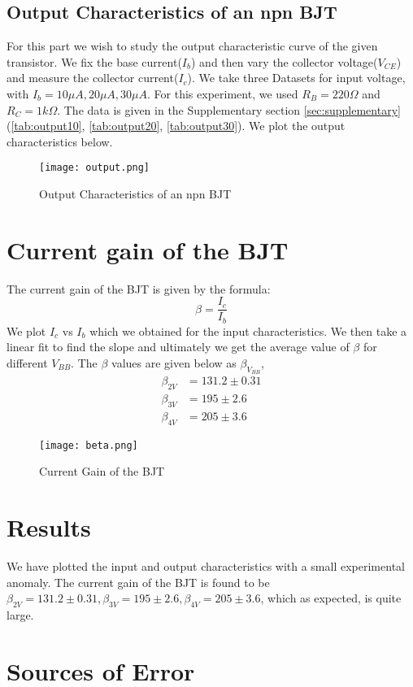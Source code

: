 \documentclass{scrartcl}
\newcommand{\1}{\mathbbm{1}}
\begin{document}
\subsection{Output Characteristics of an npn BJT}
For this part we wish to study the output characteristic curve of the given transistor. We fix the base current($I_b$) and then vary the collector voltage($V_{CE}$) and measure the collector current($I_c$). We take three 
 Datasets for input voltage, with $I_b = 10 \mu A, 20 \mu A, 30 \mu A$. For this experiment, we used $R_B = 220 \Omega$ and $R_C = 1 k\Omega$. The data is
 given in the Supplementary section \cref{sec:supplementary}(\cref{tab:output10}, \cref{tab:output20}, \cref{tab:output30}). We plot the output characteristics below.
\begin{figure}[h]
        \centering
        \texttt{[image: output.png]}
        \caption{Output Characteristics of an npn BJT}
\end{figure}
\section{Current gain of the BJT}
The current gain of the BJT is given by the formula:
\begin{equation}
        \beta = \frac{I_c}{I_b}
\end{equation}
We plot $I_c$ vs $I_b$ which we obtained for the input characteristics. We then take a linear fit to find the slope and ultimately we get the average value of $\beta$ 
for different $V_{BB}$. The $\beta$ values are given below as $\beta_{V_{BB}}$,
\begin{align}
        \beta_{2V} &= 131.2 \pm 0.31 \\
        \beta_{3V} &= 195 \pm 2.6\\
        \beta_{4V} &= 205 \pm 3.6
\end{align}
\begin{figure}[H]
        \centering
        \texttt{[image: beta.png]}
        \caption{Current Gain of the BJT}
\end{figure}
\section{Results}
We have plotted the input and output characteristics with a small experimental anomaly. The current gain of the BJT is found to be $\beta_{2V} = 131.2 \pm 0.31, \beta_{3V} = 195 \pm 2.6, \beta_{4V} = 205 \pm 3.6$, which 
as expected, is quite large. 
\section{Sources of Error}
\end{document}
